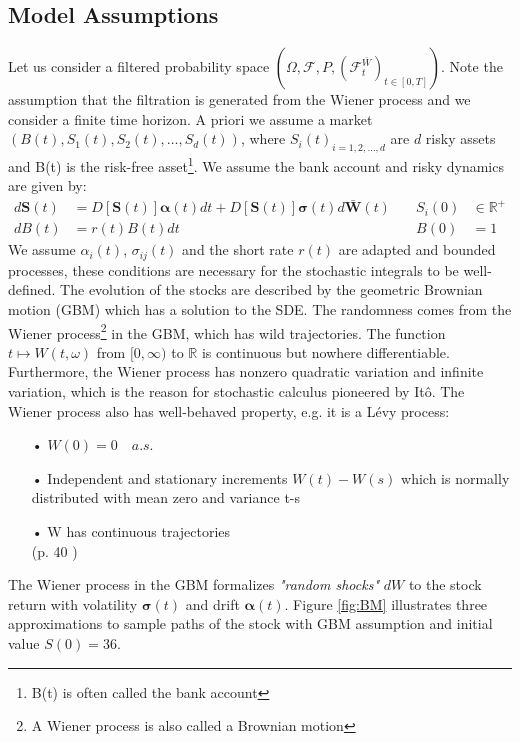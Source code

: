 \subsection{Model Assumptions}
Let us consider a filtered probability space $(\Omega, \mathcal{F}, P, (\mathcal{F}_t^{\bar{W}})_{t \in [0,T]})$. Note the assumption that the filtration is generated from the Wiener process and we consider a finite time horizon. A priori we assume a market $(B(t),S_1(t), S_2(t),\ldots, S_d(t))$, where ${S_i(t)}_{i=1,2,\ldots,d}$ are $d$ risky assets and B(t) is the risk-free asset\footnote{B(t) is often called the bank account}. We assume the bank account and risky dynamics are given by:\\
\begin{align}
d\bm{S}(t)&=D[\bm{S}(t)]\bm{\alpha}(t)dt+D[\bm{S}(t)]\bm{\sigma}(t)d\bar{\bm{W}}(t) \quad & S_i(0) &\in \mathbb{R}^+ \label{GBM-P} \\
dB(t)&=r(t)B(t)dt \quad & B(0) &= 1
\end{align}
We assume $\alpha_i(t)$, $\sigma_{ij}(t)$ and the short rate $r(t)$ are adapted and bounded processes, these conditions are necessary for the stochastic integrals to be well-defined. The evolution of the stocks are described by the geometric Brownian motion (GBM) which has a solution to the SDE. The randomness comes from the Wiener process\footnote{A Wiener process is also called a Brownian motion} in the GBM, which has wild trajectories. The function $t\mapsto W(t,\omega)$ from $[0,\infty)$ to $\mathbb{R}$ is continuous but nowhere differentiable. Furthermore, the Wiener process has nonzero quadratic variation and infinite variation, which is the reason for stochastic calculus pioneered by Itô. The Wiener process also has well-behaved property, e.g. it is a Lévy process:
\begin{enumerate}
\item[•] $W(0)=0 \quad a.s.$
\item[•] Independent and stationary increments $W(t)-W(s)$ which is normally distributed with mean zero and variance t-s
\item[•] W has continuous trajectories\\
\null \hfill (p. 40 \parencite{finKont})
\end{enumerate}
The Wiener process in the GBM formalizes \textsl{"random shocks"} $dW$ to the stock return with volatility $\bm{\sigma}(t)$ and drift $\bm{\alpha}(t)$. Figure \ref{fig:BM} illustrates three approximations to sample paths of the stock with GBM assumption and initial value $S(0)=36$.\\

